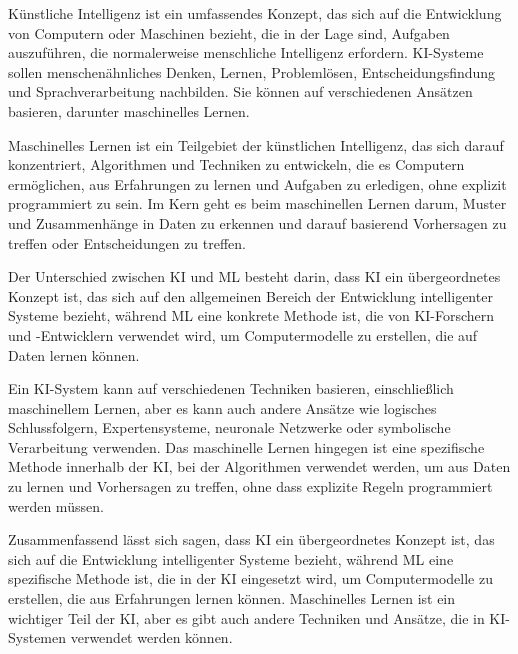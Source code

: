 Künstliche Intelligenz ist ein umfassendes Konzept, das sich auf die
Entwicklung von Computern oder Maschinen bezieht, die in der Lage sind,
Aufgaben auszuführen, die normalerweise menschliche Intelligenz erfordern.
KI-Systeme sollen menschenähnliches Denken, Lernen, Problemlösen,
Entscheidungsfindung und Sprachverarbeitung nachbilden. Sie können auf
verschiedenen Ansätzen basieren, darunter maschinelles Lernen.

Maschinelles Lernen ist ein Teilgebiet der künstlichen Intelligenz, das
sich darauf konzentriert, Algorithmen und Techniken zu entwickeln, die es
Computern ermöglichen, aus Erfahrungen zu lernen und Aufgaben zu erledigen,
ohne explizit programmiert zu sein. Im Kern geht es beim maschinellen Lernen
darum, Muster und Zusammenhänge in Daten zu erkennen und darauf basierend
Vorhersagen zu treffen oder Entscheidungen zu treffen.

Der Unterschied zwischen KI und ML besteht darin, dass KI ein übergeordnetes
Konzept ist, das sich auf den allgemeinen Bereich der Entwicklung intelligenter
Systeme bezieht, während ML eine konkrete Methode ist, die von KI-Forschern und
-Entwicklern verwendet wird, um Computermodelle zu erstellen, die auf Daten
lernen können.

Ein KI-System kann auf verschiedenen Techniken basieren, einschließlich
maschinellem Lernen, aber es kann auch andere Ansätze wie logisches
Schlussfolgern, Expertensysteme, neuronale Netzwerke oder symbolische
Verarbeitung verwenden. Das maschinelle Lernen hingegen ist eine spezifische
Methode innerhalb der KI, bei der Algorithmen verwendet werden, um aus Daten zu
lernen und Vorhersagen zu treffen, ohne dass explizite Regeln programmiert
werden müssen.

Zusammenfassend lässt sich sagen, dass KI ein übergeordnetes Konzept ist, das
sich auf die Entwicklung intelligenter Systeme bezieht, während ML eine
spezifische Methode ist, die in der KI eingesetzt wird, um Computermodelle zu
erstellen, die aus Erfahrungen lernen können. Maschinelles Lernen ist ein
wichtiger Teil der KI, aber es gibt auch andere Techniken und Ansätze, die in
KI-Systemen verwendet werden können.\cite{metaversekunstliche}\cite{kirste2019einleitung}